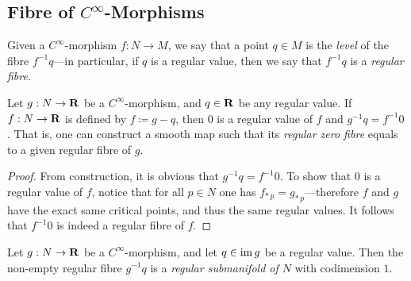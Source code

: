 \subsection{Fibre of \texorpdfstring{\(C^{\infty}\)}{Smooth}-Morphisms}

\begin{definition}
\label{def:fibres-and-levels}
Given a \(C^{\infty}\)-morphism \(f: N \to M\), we say that a point \(q \in M\)
is the \emph{level} of the fibre \(f^{-1} q\)---in particular, if \(q\) is a
regular value, then we say that \(f^{-1} q\) is a \emph{regular fibre}.
\end{definition}

\begin{lemma}
\label{lem:regular-fibre-equal-zero-regular-fibre}
Let \(g: N \to \mathbf{R}\) be a \(C^{\infty}\)-morphism, and \(q \in \mathbf{R}\) be any
regular value. If \(f: N \to \mathbf{R}\) is defined by \(f \coloneq g - q\), then
\(0\) is a regular value of \(f\) and \(g^{-1} q = f^{-1} 0\). That is, one
can construct a smooth map such that its \emph{regular zero fibre} equals to a
given regular fibre of \(g\).
\end{lemma}

\begin{proof}
From construction, it is obvious that \(g^{-1} q = f^{-1} 0\). To show that
\(0\) is a regular value of \(f\), notice that for all \(p \in N\) one has
\(f_{*\, p} = g_{*\, p}\)---therefore \(f\) and \(g\) have the exact same
critical points, and thus the same regular values. It follows that \(f^{-1} 0\)
is indeed a regular fibre of \(f\).
\end{proof}

\begin{lemma}
\label{lem:regular-fibres-are-embedded-manifolds}
Let \(g: N \to \mathbf{R}\) be a \(C^{\infty}\)-morphism, and let \(q \in \operatorname{im} g\) be a
regular value. Then the non-empty regular fibre \(g^{-1} q\) is a \emph{regular
  submanifold of \(N\)} with codimension \(1\).
\end{lemma}

